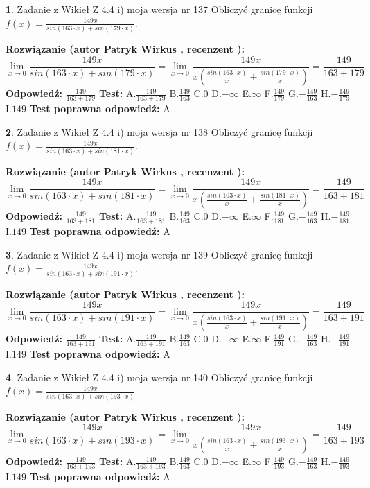 \documentclass[12pt, a4paper]{article}
\theoremstyle{definition} %
\newtheorem{zad}{}
\newcommand{\zadStart}[1]{\begin{zad}#1\newline}
\newcommand{\zadStop}{\end{zad}}
\newcommand{\rozwStart}[2]{\noindent \textbf{Rozwiązanie (autor #1 , recenzent #2): }\newline}
\newcommand{\rozwStop}{\newline}
\newcommand{\odpStart}{\noindent \textbf{Odpowiedź:}\newline}
\newcommand{\odpStop}{\newline}
\newcommand{\testStart}{\noindent \textbf{Test:}\newline}
\newcommand{\testStop}{\newline}
\newcommand{\kluczStart}{\noindent \textbf{Test poprawna odpowiedź:}\newline}
\newcommand{\kluczStop}{\newline}
\begin{document}
\zadStart{Zadanie z Wikieł Z 4.4 i) moja wersja nr 137}
Obliczyć granicę funkcji $f(x)=\frac{149x}{sin(163\cdot x) +sin(179\cdot x)}$.
\zadStop
\rozwStart{Patryk Wirkus}{}
$$\lim\limits_{x\to 0}\frac{149x}{sin(163\cdot x) +sin(179\cdot x)}=\lim\limits_{x\to 0}\frac{149x}{x(\frac{sin(163\cdot x)}{x}+\frac{sin(179\cdot x)}{x})}=\frac{149}{163+179}$$
\rozwStop
\odpStart
$\frac{149}{163+179}$
\odpStop
\testStart
A.$\frac{149}{163+179}$
B.$\frac{149}{163}$
C.$0$
D.$-\infty$
E.$\infty$
F.$\frac{149}{179}$
G.$-\frac{149}{163}$
H.$-\frac{149}{179}$
I.$149$
\testStop
\kluczStart
A
\kluczStop



\zadStart{Zadanie z Wikieł Z 4.4 i) moja wersja nr 138}
Obliczyć granicę funkcji $f(x)=\frac{149x}{sin(163\cdot x) +sin(181\cdot x)}$.
\zadStop
\rozwStart{Patryk Wirkus}{}
$$\lim\limits_{x\to 0}\frac{149x}{sin(163\cdot x) +sin(181\cdot x)}=\lim\limits_{x\to 0}\frac{149x}{x(\frac{sin(163\cdot x)}{x}+\frac{sin(181\cdot x)}{x})}=\frac{149}{163+181}$$
\rozwStop
\odpStart
$\frac{149}{163+181}$
\odpStop
\testStart
A.$\frac{149}{163+181}$
B.$\frac{149}{163}$
C.$0$
D.$-\infty$
E.$\infty$
F.$\frac{149}{181}$
G.$-\frac{149}{163}$
H.$-\frac{149}{181}$
I.$149$
\testStop
\kluczStart
A
\kluczStop



\zadStart{Zadanie z Wikieł Z 4.4 i) moja wersja nr 139}
Obliczyć granicę funkcji $f(x)=\frac{149x}{sin(163\cdot x) +sin(191\cdot x)}$.
\zadStop
\rozwStart{Patryk Wirkus}{}
$$\lim\limits_{x\to 0}\frac{149x}{sin(163\cdot x) +sin(191\cdot x)}=\lim\limits_{x\to 0}\frac{149x}{x(\frac{sin(163\cdot x)}{x}+\frac{sin(191\cdot x)}{x})}=\frac{149}{163+191}$$
\rozwStop
\odpStart
$\frac{149}{163+191}$
\odpStop
\testStart
A.$\frac{149}{163+191}$
B.$\frac{149}{163}$
C.$0$
D.$-\infty$
E.$\infty$
F.$\frac{149}{191}$
G.$-\frac{149}{163}$
H.$-\frac{149}{191}$
I.$149$
\testStop
\kluczStart
A
\kluczStop



\zadStart{Zadanie z Wikieł Z 4.4 i) moja wersja nr 140}
Obliczyć granicę funkcji $f(x)=\frac{149x}{sin(163\cdot x) +sin(193\cdot x)}$.
\zadStop
\rozwStart{Patryk Wirkus}{}
$$\lim\limits_{x\to 0}\frac{149x}{sin(163\cdot x) +sin(193\cdot x)}=\lim\limits_{x\to 0}\frac{149x}{x(\frac{sin(163\cdot x)}{x}+\frac{sin(193\cdot x)}{x})}=\frac{149}{163+193}$$
\rozwStop
\odpStart
$\frac{149}{163+193}$
\odpStop
\testStart
A.$\frac{149}{163+193}$
B.$\frac{149}{163}$
C.$0$
D.$-\infty$
E.$\infty$
F.$\frac{149}{193}$
G.$-\frac{149}{163}$
H.$-\frac{149}{193}$
I.$149$
\testStop
\kluczStart
A
\kluczStop
\end{document}

